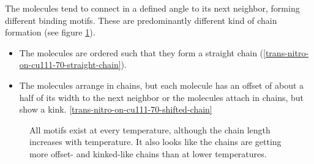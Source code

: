 The molecules tend to connect in a defined angle to its next neighbor, forming different binding motifs. These are predominantly different kind of chain formation (see figure \ref{fig:two-leg-trans-cu111-motifs}).
\begin{itemize}
 \item The molecules are ordered such that they form a straight chain (\autoref{trans-nitro-on-cu111-70-straight-chain}).
 \item The molecules arrange in chains, but each molecule has an offset of about a half of its width to the next neighbor or the molecules attach in chains, but show a kink. \autoref{trans-nitro-on-cu111-70-shifted-chain}
\end{itemize}

\begin{figure}[h]
 \centering
  \qquad
\caption{All motifs exist at every temperature, although the chain length increases with temperature. It also looks like the chains are getting more offset- and kinked-like chains than at lower temperatures.}
\label{fig:two-leg-trans-cu111-motifs}
\end{figure}

